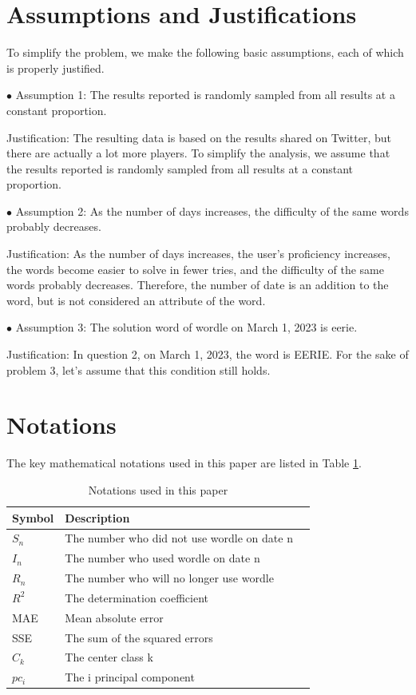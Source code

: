 \documentclass[
  journal=medium,
  manuscript=Report,
  year=2023,
  volume=37,
]{cup-journal}
\begin{document}
\section{Assumptions and Justifications}

To simplify the problem, we make the following basic assumptions, each of which is properly justified. 

$\bullet$ Assumption 1: The results reported is randomly sampled from all results at a constant proportion. 

Justification: The resulting data is based on the results shared on Twitter, but there are actually a lot more players. To simplify the analysis, we assume that the results reported is randomly sampled from all results at a constant proportion. 

$\bullet$ Assumption 2: As the number of days increases, the difficulty of the same words probably decreases. 

Justification: As the number of days increases, the user's proficiency increases, the words become easier to solve in fewer tries, and the difficulty of the same words probably decreases. Therefore, the number of date is an addition to the word, but is not considered an attribute of the word.

$\bullet$ Assumption 3: The solution word of wordle on March 1, 2023 is eerie. 

Justification: In question 2, on March 1, 2023, the word is EERIE. For the sake of problem 3, let's assume that this condition still holds.

\section{Notations}

The key mathematical notations used in this paper are listed in Table \ref{Notations}. 

\begin{table}[hbt!]
    \begin{threeparttable}
    \caption{Notations used in this paper}
    \label{Notations}
    \begin{tabular}{lll}
    \toprule
    \headrow Symbol & Description \\ 
    \midrule
    $S_n$ & The number who did not use wordle on date n\\ 
    \midrule
    $I_n$ & The number who used wordle on date n\\ 
    \midrule
    $R_n$ & The number who will no longer use wordle\\ 
    \midrule
    $R^2$ & The determination coefficient\\ 
    \midrule
    MAE & Mean absolute error\\ 
    \midrule
    SSE & The sum of the squared errors\\ 
    \midrule
    $C_k$ & The center class k\\ 
    \midrule
    $pc_i$ & The i principal component \\ 
    \bottomrule 
    \end{tabular}
    \end{threeparttable}
\end{table}
\end{document}
